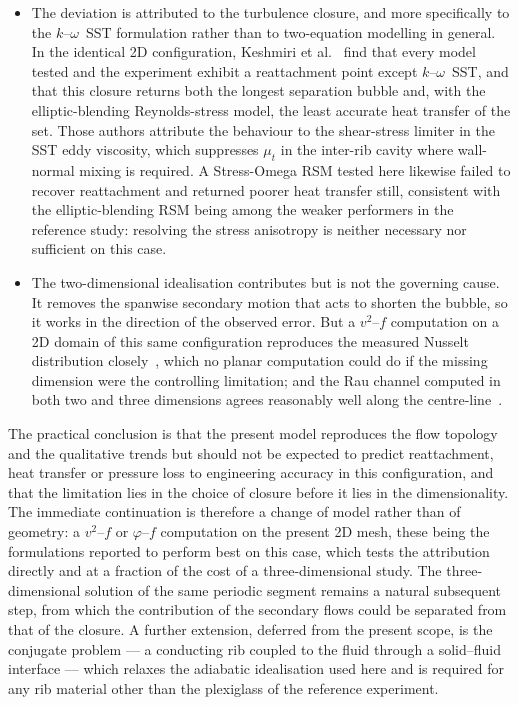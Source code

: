\documentclass[11pt,a4paper]{article}
\begin{document}
\begin{itemize}
  \item The deviation is attributed to the turbulence closure, and more
  specifically to the $k$--$\omega$~SST formulation rather than to
  two-equation modelling in general. In the identical 2D configuration,
  Keshmiri et al.~\cite{keshmiri2016} find that every model tested and the
  experiment exhibit a reattachment point except $k$--$\omega$~SST, and that
  this closure returns both the longest separation bubble and, with the
  elliptic-blending Reynolds-stress model, the least accurate heat transfer
  of the set. Those authors attribute the behaviour to the shear-stress
  limiter in the SST eddy viscosity, which suppresses $\mu_t$ in the
  inter-rib cavity where wall-normal mixing is required. A Stress-Omega RSM
  tested here likewise failed to recover reattachment and returned poorer
  heat transfer still, consistent with the elliptic-blending RSM being among
  the weaker performers in the reference study: resolving the stress
  anisotropy is neither necessary nor sufficient on this case.

  \item The two-dimensional idealisation contributes but is not the
  governing cause. It removes the spanwise secondary motion that acts to
  shorten the bubble, so it works in the direction of the observed error.
  But a $v^{2}$--$f$ computation on a 2D domain of this same configuration
  reproduces the measured Nusselt distribution closely~\cite{keshmiri2016},
  which no planar computation could do if the missing dimension were the
  controlling limitation; and the Rau channel computed in both two and three
  dimensions agrees reasonably well along the
  centre-line~\cite{keshmiri2012}.

\end{itemize}

The practical conclusion is that the present model reproduces the flow
topology and the qualitative trends but should not be expected to predict
reattachment, heat transfer or pressure loss to engineering accuracy in this
configuration, and that the limitation lies in the choice of closure before
it lies in the dimensionality. The immediate continuation is therefore a
change of model rather than of geometry: a $v^{2}$--$f$ or $\varphi$--$f$
computation on the present 2D mesh, these being the formulations reported to
perform best on this case, which tests the attribution directly and at a
fraction of the cost of a three-dimensional study. The three-dimensional
solution of the same periodic segment remains a natural subsequent step,
from which the contribution of the secondary flows could be separated from
that of the closure. A further extension, deferred from the
present scope, is the conjugate problem --- a conducting rib coupled to the
fluid through a solid--fluid interface --- which relaxes the adiabatic
idealisation used here and is required for any rib material other than the
plexiglass of the reference experiment.
\end{document}
